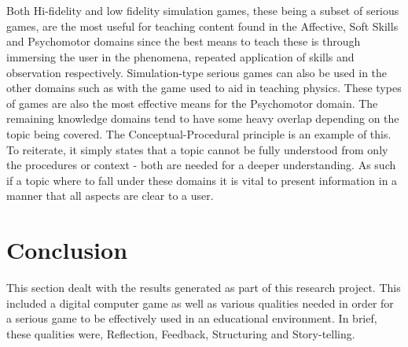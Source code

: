 \\\\
Both Hi-fidelity and low fidelity simulation games, these being a subset of serious games, are the most useful for teaching content found in the Affective, Soft Skills and Psychomotor domains since the best means to teach these is through immersing the user in the phenomena, repeated application of skills and observation respectively. Simulation-type serious games can also be used in the other domains such as with the game used to aid in teaching physics. These types of games are also the most effective means for the Psychomotor domain.
\newpage
\noindent The remaining knowledge domains tend to have some heavy overlap depending on the topic being covered. The Conceptual-Procedural principle is an example of this. To reiterate, it simply states that a topic cannot be fully understood from only the procedures or context - both are needed for a deeper understanding. As such if a topic where to fall under these domains it is vital to present information in a manner that all aspects are clear to a user.

\section{Conclusion}
This section dealt with the results generated as part of this research project. This included a digital computer game as well as various qualities needed in order for a serious game to be effectively used in an educational environment. In brief, these qualities were, Reflection, Feedback, Structuring and Story-telling. 